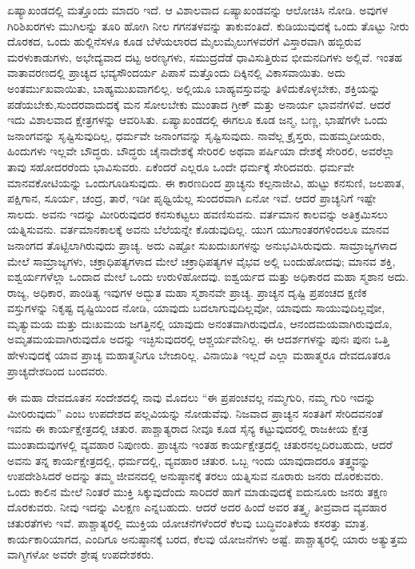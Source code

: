 ಏಷ್ಯಾಖಂಡದಲ್ಲಿ ಮತ್ತೊಂದು ಮಾದರಿ ಇದೆ. ಆ ವಿಶಾಲವಾದ ಏಷ್ಯಾಖಂಡವನ್ನು ಆಲೋಚಿಸಿ ನೋಡಿ. ಅವುಗಳ ಗಿರಿಶಿಖರಗಳು ಮುಗಿಲನ್ನು ತೂರಿ ಹೋಗಿ ನೀಲ ಗಗನ\break ತಳವನ್ನು ತಾಕುವಂತಿದೆ. ಕುಡಿಯುವುದಕ್ಕೆ ಒಂದು ತೊಟ್ಟು ನೀರು ದೊರಕದ, ಒಂದು ಹುಲ್ಲಿನೆಸಳೂ ಕೂಡ ಬೆಳೆಯಲಾರದ ಮೈಲುಮೈಲುಗಳವರೆಗೆ ವಿಸ್ತಾರವಾಗಿ ಹಬ್ಬಿರುವ ಮರಳುಕಾಡುಗಳು, ಅಭೇದ್ಯವಾದ ದಟ್ಟ ಅರಣ್ಯಗಳು, ಸಮುದ್ರದೆಡೆ ಧಾವಿಸುತ್ತಿರುವ ಭೀಮನದಿಗಳು ಅಲ್ಲಿವೆ. ಇಂತಹ ವಾತಾವರಣದಲ್ಲಿ ಪ್ರಾಚ್ಯದ ಭವ್ಯಸೌಂದರ್ಯ ಪಿಪಾಸೆ ಮತ್ತೊಂದು ದಿಕ್ಕಿನಲ್ಲಿ ವಿಕಾಸವಾಯಿತು. ಅದು ಅಂತರ್ಮುಖವಾಯಿತು, ಬಾಹ್ಯಮುಖವಾಗಲಿಲ್ಲ. ಅಲ್ಲಿಯೂ ಬಾಹ್ಯವಸ್ತುವನ್ನು ತಿಳಿದುಕೊಳ್ಳಬೇಕು, ಶಕ್ತಿಯನ್ನು ಪಡೆಯಬೇಕು,\break ಸುಂದರವಾದುದಕ್ಕೆ ಮನ ಸೋಲಬೇಕು ಮುಂತಾದ ಗ್ರೀಕ್​ ಮತ್ತು ಅನಾರ್ಯ ಭಾವನೆಗಳಿವೆ. ಆದರೆ ಇದು ವಿಶಾಲವಾದ ಕ್ಷೇತ್ರಗಳನ್ನು ಆವರಿಸಿತು. ಏಷ್ಯಾಖಂಡದಲ್ಲಿ ಈಗಲೂ ಕೂಡ ಜನ್ಮ, ಬಣ್ಣ, ಭಾಷೆಗಳೇ ಒಂದು ಜನಾಂಗವನ್ನು ಸೃಷ್ಟಿಸುವುದಿಲ್ಲ, ಧರ್ಮವೇ ಜನಾಂಗವನ್ನು ಸೃಷ್ಟಿಸುವುದು. ನಾವೆಲ್ಲ ಕ್ರೈಸ್ತರು, ಮಹಮ್ಮದೀಯರು, ಹಿಂದುಗಳು ಇಲ್ಲವೇ ಬೌದ್ಧರು. ಬೌದ್ಧರು ಚೈನಾದೇಶಕ್ಕೆ ಸೇರಿರಲಿ ಅಥವಾ ಪರ್ಷಿಯಾ ದೇಶಕ್ಕೆ ಸೇರಿರಲಿ, ಅವರೆಲ್ಲಾ ತಾವು ಸಹೋದರರೆಂದು ಭಾವಿಸುವರು. ಏಕೆಂದರೆ ಎಲ್ಲರೂ ಒಂದೇ ಧರ್ಮಕ್ಕೆ ಸೇರಿದವರು. ಧರ್ಮವೇ ಮಾನವಕೋಟಿಯನ್ನು ಒಂದುಗೂಡಿಸುವುದು. ಈ ಕಾರಣದಿಂದ ಪ್ರಾಚ್ಯನು ಕಲ್ಪನಾಜೀವಿ, ಹುಟ್ಟು ಕನಸುಣಿ, ಜಲಪಾತ, ಪಕ್ಷಿಗಾನ, ಸೂರ್ಯ, ಚಂದ್ರ, ತಾರೆ, ಇಡೀ ಪೃಥ್ವಿಯೆಲ್ಲ ಸುಂದರವಾಗಿ ಏನೋ ಇವೆ. ಆದರೆ ಪ್ರಾಚ್ಯನಿಗೆ ಇಷ್ಟೇ ಸಾಲದು. ಅವನು ಇದನ್ನು ಮೀರಿರುವುದರ ಕನಸುಕಟ್ಟಲು ಹವಣಿಸುವನು. ವರ್ತಮಾನ ಕಾಲವನ್ನು ಅತಿಕ್ರಮಿಸಲು ಯತ್ನಿಸುವನು. ವರ್ತಮಾನಕಾಲಕ್ಕೆ ಅವನು ಬೆಲೆಯನ್ನೇ ಕೊಡುವುದಿಲ್ಲ. ಯುಗ ಯುಗಾಂತರಗಳಿಂದಲೂ ಮಾನವ ಜನಾಂಗದ ತೊಟ್ಟಿಲಾಗಿರುವುದು ಪ್ರಾಚ್ಯ. ಅದು ಎಷ್ಟೋ ಸುಖದುಃಖಗಳನ್ನು ಅನುಭವಿಸಿರುವುದು. ಸಾಮ್ರಾಜ್ಯಗಳಾದ ಮೇಲೆ ಸಾಮ್ರಾಜ್ಯಗಳು, ಚಕ್ರಾಧಿಪತ್ಯಗಳಾದ ಮೇಲೆ ಚಕ್ರಾಧಿಪತ್ಯಗಳ ವೈಭವ ಅಲ್ಲಿ ಬಂದುಹೋದವು; ಮಾನವ ಶಕ್ತಿ, ಐಶ್ವರ್ಯಗಳೆಲ್ಲಾ ಒಂದಾದ ಮೇಲೆ ಒಂದು ಉರುಳಿಹೋದವು. ಐಶ್ವರ್ಯದ ಮತ್ತು ಅಧಿಕಾರದ ಮಹಾ ಸ್ಮಶಾನ ಅದು. ರಾಜ್ಯ, ಅಧಿಕಾರ, ಪಾಂಡಿತ್ಯ ಇವುಗಳ ಅದ್ಭುತ ಮಹಾ ಸ್ಮಶಾನವೇ ಪ್ರಾಚ್ಯ. ಪ್ರಾಚ್ಯನ ದೃಷ್ಟಿ ಪ್ರಪಂಚದ ಕ್ಷಣಿಕ ವಸ್ತುಗಳನ್ನು ನಿಕೃಷ್ಟ ದೃಷ್ಟಿಯಿಂದ ನೋಡಿ, ಯಾವುದು ಬದಲಾಗುವುದಿಲ್ಲವೋ, ಯಾವುದು ಸಾಯುವುದಿಲ್ಲವೋ, ಮೃತ್ಯುಮಯ ಮತ್ತು ದುಃಖಮಯ ಜಗತ್ತಿನಲ್ಲಿ ಯಾವುದು ಅನಂತವಾಗಿರುವುದೊ, ಆನಂದಮಯವಾಗಿರುವುದೊ, ಅಮೃತಮಯ\-ವಾಗಿರುವುದೊ ಅದನ್ನು ಇಚ್ಛಿಸುವುದರಲ್ಲಿ ಆಶ್ಚರ್ಯವೇನಿಲ್ಲ. ಈ ಆದರ್ಶಗಳನ್ನು ಪುನಃ ಪುನಃ ಒತ್ತಿ ಹೇಳುವುದಕ್ಕೆ ಯಾವ ಪ್ರಾಚ್ಯ ಮಹಾತ್ಮನಿಗೂ ಬೇಜಾರಿಲ್ಲ. ವಿನಾಯಿತಿ ಇಲ್ಲದೆ ಎಲ್ಲಾ ಮಹಾತ್ಮರೂ ದೇವದೂತರೂ ಪ್ರಾಚ್ಯದೇಶದಿಂದ ಬಂದವರು.

ಈ ಮಹಾ ದೇವದೂತನ ಸಂದೇಶದಲ್ಲಿ ನಾವು ಮೊದಲು “ಈ ಪ್ರಪಂಚವಲ್ಲ ನಮ್ಮ\break ಗುರಿ, ನಮ್ಮ ಗುರಿ ಇದನ್ನು ಮೀರಿರುವುದು” ಎಂಬ ಉಪದೇಶದ ಪಲ್ಲವಿಯನ್ನು ನೋಡು\-ವೆವು. ನಿಜವಾದ ಪ್ರಾಚ್ಯನ ಸಂತತಿಗೆ ಸೇರಿದವನಂತೆ ಇವನು ಈ ಕಾರ್ಯಕ್ಷೇತ್ರದಲ್ಲಿ ಚತುರ. ಪಾಶ್ಚಾತ್ಯರಾದ ನೀವೂ ಕೂಡ ಸೈನ್ಯ ಕಟ್ಟುವುದರಲ್ಲಿ ರಾಜಕೀಯ ಕ್ಷೇತ್ರ ಮುಂತಾದುವು\-ಗಳಲ್ಲಿ ವ್ಯವಹಾರ ನಿಪುಣರು. ಪ್ರಾಚ್ಯನು ಇಂತಹ ಕಾರ್ಯಕ್ಷೇತ್ರದಲ್ಲಿ ಚತುರನಲ್ಲ\-ದಿರಬಹುದು, ಆದರೆ ಅವನು ತನ್ನ ಕಾರ್ಯಕ್ಷೇತ್ರದಲ್ಲಿ, ಧರ್ಮದಲ್ಲಿ, ವ್ಯವಹಾರ ಚತುರ. ಒಬ್ಬ ಇಂದು ಯಾವುದಾದರೂ ತತ್ತ್ವವನ್ನು ಉಪದೇಶಿಸಿದರೆ ಅದನ್ನು ತಮ್ಮ ಜೀವನದಲ್ಲಿ ಅನುಷ್ಠಾನಕ್ಕೆ ತರಲು ಯತ್ನಿಸುವ ನೂರಾರು ಜನರು ದೊರಕುವರು. ಒಂದು ಕಾಲಿನ ಮೇಲೆ ನಿಂತರೆ ಮುಕ್ತಿ ಸಿಕ್ಕುವುದೆಂದು ಸಾರಿದರೆ ಹಾಗೆ ಮಾಡುವುದಕ್ಕೆ ಐದುನೂರು ಜನರು ತಕ್ಷಣ ದೊರಕುವರು. ನೀವು ಇದನ್ನು ವಿಲಕ್ಷಣ ಎನ್ನಬಹುದು. ಆದರೆ ಅದರ ಹಿಂದೆ ಅವರ ತತ್ತ್ವ, ತೀವ್ರವಾದ ವ್ಯವಹಾರ ಚತುರತೆಗಳು ಇವೆ. ಪಾಶ್ಚಾತ್ಯರಲ್ಲಿ ಮುಕ್ತಿಯ ಯೋಚನೆಗಳೆಂದರೆ ಕೆಲವು ಬುದ್ಧಿವಂತಿಕೆಯ ಕಸರತ್ತು ಮಾತ್ರ. ಕಾರ್ಯಕಾರಿಯಾಗದ, ಎಂದಿಗೂ ಅನುಷ್ಠಾನಕ್ಕೆ ಬರದ, ಕೆಲವು ಯೋಜನೆಗಳು ಅಷ್ಟೆ. ಪಾಶ್ಚಾತ್ಯರಲ್ಲಿ ಯಾರು ಅತ್ಯುತ್ತಮ ವಾಗ್ಮಿಗಳೋ ಅವರೇ ಶ್ರೇಷ್ಠ ಉಪದೇಶಕರು.

